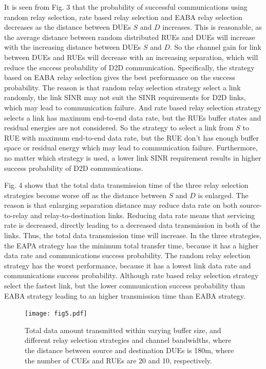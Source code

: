 \documentclass[conference]{IEEEtran}
\begin{document}
It is seen from Fig. 3 that the probability of successful communications using random relay selection, rate based relay selection and EABA relay selection decreases as the distance between DUEs $S$ and $D$ increases. This is reasonable, as the average distance between random distributed RUEs and DUEs will increase with the increasing distance between DUEs $S$ and $D$. So the channel gain for link between DUEs and RUEs will decrease with an increasing separation, which will reduce the success probability of D2D communication. Specifically, the strategy based on EABA relay selection gives the best performance on the success probability. The reason is that random relay selection strategy select a link randomly, the link SINR may not suit the SINR requirements for D2D links, which may lead to communication failure. And rate based relay selection strategy selects a link has maximum end-to-end data rate, but the RUEs buffer states and residual energies are not considered. So the strategy to select a link from $S$ to RUE with maximum end-to-end data rate, but the RUE don't has enough buffer space or residual energy which may lead to communication failure. Furthermore, no matter which strategy is used, a lower link SINR requirement results in higher success probability of D2D communications.

Fig. 4 shows that the total data transmission time of the three relay selection strategies become worse off as the distance between $S$ and $D$ is enlarged. The reason is that enlarging separation distance may reduce data rate on both source-to-relay and relay-to-destination links. Reducing data rate means that servicing rate is decreased, directly leading to a decreased data transmission in both of the links. Thus, the total data transmission time will increase. In the three strategies, the EAPA strategy has the minimum total transfer time, because it has a higher data rate and communications success probability. The random relay selection strategy has the worst performance, because it has a lowest link data rate and communications success probability. Although rate based relay selection strategy select the fastest link, but the lower communication success probability than EABA strategy leading to an higher transmission time than EABA strategy.
\begin{figure}[!t]
\center
\texttt{[image: fig5.pdf]}
\caption{Total data amount transmitted within varying buffer size, and different relay selection strategies and channel bandwidths, where the distance between source and destination DUEs is 180m, where the number of CUEs and RUEs are 20 and 10, respectively.}
\label{fig_time}
\end{figure}
\end{document}
